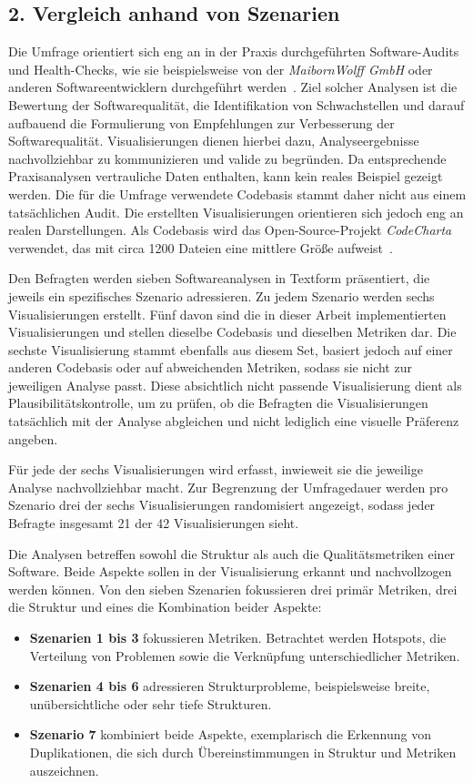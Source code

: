 \subsection*{2. Vergleich anhand von Szenarien} \label{sec:VergleichSzenarien}
Die Umfrage orientiert sich eng an in der Praxis durchgeführten Software-Audits und Health-Checks, wie sie beispielsweise von der \textit{MaibornWolff GmbH} oder anderen Softwareentwicklern durchgeführt werden~\cite{health_check_mw}. Ziel solcher Analysen ist die Bewertung der Softwarequalität, die Identifikation von Schwachstellen und darauf aufbauend die Formulierung von Empfehlungen zur Verbesserung der Softwarequalität. Visualisierungen dienen hierbei dazu, Analyseergebnisse nachvollziehbar zu kommunizieren und valide zu begründen. Da entsprechende Praxisanalysen vertrauliche Daten enthalten, kann kein reales Beispiel gezeigt werden. Die für die Umfrage verwendete Codebasis stammt daher nicht aus einem tatsächlichen Audit. Die erstellten Visualisierungen orientieren sich jedoch eng an realen Darstellungen. Als Codebasis wird das Open-Source-Projekt \textit{CodeCharta} verwendet, das mit circa 1200 Dateien eine mittlere Größe aufweist~\cite{code_charta_github}.

Den Befragten werden sieben Softwareanalysen in Textform präsentiert, die jeweils ein spezifisches Szenario adressieren. Zu jedem Szenario werden sechs Visualisierungen erstellt. Fünf davon sind die in dieser Arbeit implementierten Visualisierungen und stellen dieselbe Codebasis und dieselben Metriken dar. Die sechste Visualisierung stammt ebenfalls aus diesem Set, basiert jedoch auf einer anderen Codebasis oder auf abweichenden Metriken, sodass sie nicht zur jeweiligen Analyse passt. Diese absichtlich nicht passende Visualisierung dient als Plausibilitätskontrolle, um zu prüfen, ob die Befragten die Visualisierungen tatsächlich mit der Analyse abgleichen und nicht lediglich eine visuelle Präferenz angeben.

Für jede der sechs Visualisierungen wird erfasst, inwieweit sie die jeweilige Analyse nachvollziehbar macht. Zur Begrenzung der Umfragedauer werden pro Szenario drei der sechs Visualisierungen randomisiert angezeigt, sodass jeder Befragte insgesamt 21 der 42 Visualisierungen sieht.

Die Analysen betreffen sowohl die Struktur als auch die Qualitätsmetriken einer Software. Beide Aspekte sollen in der Visualisierung erkannt und nachvollzogen werden können. Von den sieben Szenarien fokussieren drei primär Metriken, drei die Struktur und eines die Kombination beider Aspekte:
\begin{itemize}
    \item \textbf{Szenarien 1 bis 3} fokussieren Metriken. Betrachtet werden Hotspots, die Verteilung von Problemen sowie die Verknüpfung unterschiedlicher Metriken.
    \item \textbf{Szenarien 4 bis 6} adressieren Strukturprobleme, beispielsweise breite, unübersichtliche oder sehr tiefe Strukturen.
    \item \textbf{Szenario 7} kombiniert beide Aspekte, exemplarisch die Erkennung von Duplikationen, die sich durch Übereinstimmungen in Struktur und Metriken auszeichnen.
\end{itemize}

